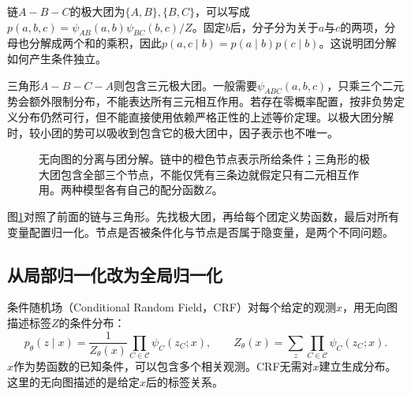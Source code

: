 链$A-B-C$的极大团为$\{A,B\},\{B,C\}$，可以写成$p(a,b,c)=\psi_{AB}(a,b)\psi_{BC}(b,c)/Z$。固定$b$后，分子分为关于$a$与$c$的两项，分母也分解成两个和的乘积，因此$p(a,c\mid b)=p(a\mid b)p(c\mid b)$。这说明团分解如何产生条件独立。

三角形$A-B-C-A$则包含三元极大团。一般需要$\psi_{ABC}(a,b,c)$，只乘三个二元势会额外限制分布，不能表达所有三元相互作用。若存在零概率配置，按非负势定义分布仍然可行，但不能直接使用依赖严格正性的上述等价定理。以极大团分解时，较小团的势可以吸收到包含它的极大团中，因子表示也不唯一。

\begin{figure}[htbp]
\centering
{}
\caption{无向图的分离与团分解。链中的橙色节点表示所给条件；三角形的极大团包含全部三个节点，不能仅凭有三条边就假定只有二元相互作用。两种模型各有自己的配分函数$Z$。}
\label{fig:bayes-clique-factorization}
\end{figure}

图\ref{fig:bayes-clique-factorization}对照了前面的链与三角形。先找极大团，再给每个团定义势函数，最后对所有变量配置归一化。节点是否被条件化与节点是否属于隐变量，是两个不同问题。

\subsection{从局部归一化改为全局归一化}
条件随机场（Conditional Random Field，CRF）对每个给定的观测$x$，用无向图描述标签$Z$的条件分布\cite{lafferty2001crf}：
\begin{equation}
 p_\theta(z\mid x)=\frac{1}{Z_\theta(x)}
 \prod_{C\in\mathcal C}\psi_C(z_C;x),\qquad
 Z_\theta(x)=\sum_z\prod_{C\in\mathcal C}\psi_C(z_C;x).
\end{equation}
$x$作为势函数的已知条件，可以包含多个相关观测。CRF无需对$x$建立生成分布。这里的无向图描述的是给定$x$后的标签关系。

